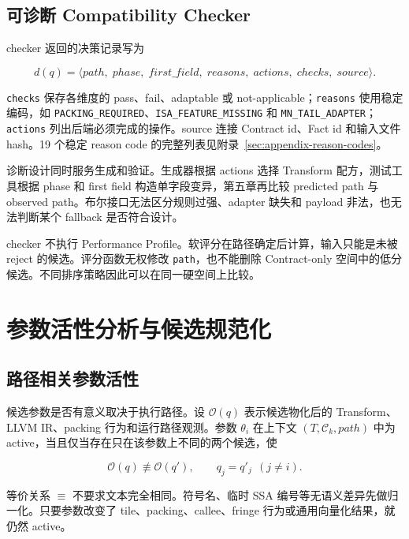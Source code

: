 \subsection{可诊断 Compatibility Checker}

checker 返回的决策记录写为

\begin{equation}
d(q)=
\langle
path,\;phase,\;first\_field,\;reasons,\;actions,\;checks,\;source
\rangle .
\label{eq:chapter4-decision-record}
\end{equation}

\texttt{checks} 保存各维度的 pass、fail、adaptable 或 not-applicable；\texttt{reasons} 使用稳定编码，如 \texttt{PACKING\_REQUIRED}、\texttt{ISA\_FEATURE\_MISSING} 和 \texttt{MN\_TAIL\_ADAPTER}；\texttt{actions} 列出后端必须完成的操作。source 连接 Contract id、Fact id 和输入文件 hash。19 个稳定 reason code 的完整列表见附录~\ref{sec:appendix-reason-codes}。

诊断设计同时服务生成和验证。生成器根据 actions 选择 Transform 配方，测试工具根据 phase 和 first field 构造单字段变异，第五章再比较 predicted path 与 observed path。布尔接口无法区分规则过强、adapter 缺失和 payload 非法，也无法判断某个 fallback 是否符合设计。

checker 不执行 Performance Profile。软评分在路径确定后计算，输入只能是未被 reject 的候选。评分函数无权修改 \texttt{path}，也不能删除 Contract-only 空间中的低分候选。不同排序策略因此可以在同一硬空间上比较。

\section{参数活性分析与候选规范化}

\subsection{路径相关参数活性}

候选参数是否有意义取决于执行路径。设 $\mathcal{O}(q)$ 表示候选物化后的 Transform、LLVM IR、packing 行为和运行路径观测。参数 $\theta_i$ 在上下文 $(T,\mathcal{C}_k,path)$ 中为 active，当且仅当存在只在该参数上不同的两个候选，使

\begin{equation}
\mathcal{O}(q)\not\equiv\mathcal{O}(q'),
\qquad
q_j=q'_j\ \ (j\neq i).
\label{eq:chapter4-active-parameter}
\end{equation}

等价关系 $\equiv$ 不要求文本完全相同。符号名、临时 SSA 编号等无语义差异先做归一化。只要参数改变了 tile、packing、callee、fringe 行为或通用向量化结果，就仍然 active。

